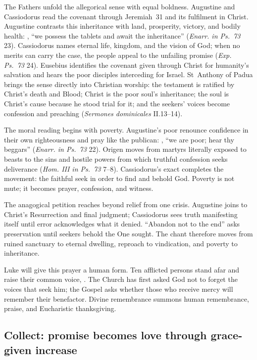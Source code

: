 The Fathers unfold the allegorical sense with equal boldness. Augustine and
Cassiodorus read the covenant through Jeremiah~31 and its fulfilment in Christ.
Augustine contrasts this inheritance with land,
prosperity, victory, and bodily health: , ``we possess the tablets and await the inheritance''
(\emph{Enarr. in Ps.~73} 23). Cassiodorus names eternal life, kingdom, and the
vision of God; when no merits can carry the case, the people appeal to the
unfailing promise (\emph{Exp. Ps.~73} 24). Eusebius identifies the covenant
given through Christ for humanity's salvation and hears the poor disciples
interceding for Israel. St~Anthony of Padua brings the sense directly into
Christian worship: the testament is ratified by Christ's death and Blood;
Christ is the poor soul's inheritance; the soul is Christ's cause because he
stood trial for it; and the seekers' voices become confession and preaching
(\emph{Sermones dominicales} II.13--14).

The moral reading begins with poverty. Augustine's poor renounce confidence in
their own righteousness and pray like the publican: , ``we are poor; hear thy beggars'' (\emph{Enarr. in
Ps.~73} 22). Origen moves from martyrs literally exposed to beasts to the sins
and hostile powers from which truthful confession seeks deliverance
(\emph{Hom. III in Ps.~73} 7--8). Cassiodorus's exact  completes
the movement: the faithful seek in order to find and behold God. Poverty is not
mute; it becomes prayer, confession, and witness.

The anagogical petition reaches beyond relief from one crisis. Augustine joins
 to Christ's Resurrection and final judgment; Cassiodorus sees
truth manifesting itself until error acknowledges what it denied. ``Abandon
not to the end'' asks preservation until seekers behold the One sought. The
chant therefore moves from ruined sanctuary to eternal dwelling, reproach to
vindication, and poverty to inheritance.

Luke will give this prayer a human form. Ten afflicted persons stand afar and
raise their common voice, . The Church
has first asked God not to forget the voices that seek him; the Gospel asks
whether those who receive mercy will remember their benefactor. Divine
remembrance summons human remembrance, praise, and Eucharistic thanksgiving.

\subsection*{Collect: promise becomes love through grace-given increase\enspace{}}

